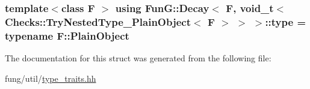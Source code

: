\subsubsection[{type}]{\setlength{\rightskip}{0pt plus 5cm}template$<$class F $>$ using {\bf Fun\+G\+::\+Decay}$<$ F, {\bf void\+\_\+t}$<$ Checks\+::\+Try\+Nested\+Type\+\_\+\+Plain\+Object$<$ F $>$ $>$ $>$\+::{\bf type} =  typename F\+::\+Plain\+Object}\label{structFunG_1_1Decay_3_01F_00_01void__t_3_01Checks_1_1TryNestedType__PlainObject_3_01F_01_4_01_4_01_4_aaf19af34cb1c06b71ea99737d9375f52}


The documentation for this struct was generated from the following file\+:\begin{DoxyCompactItemize}
\item 
fung/util/\hyperlink{type__traits_8hh}{type\+\_\+traits.\+hh}\end{DoxyCompactItemize}

